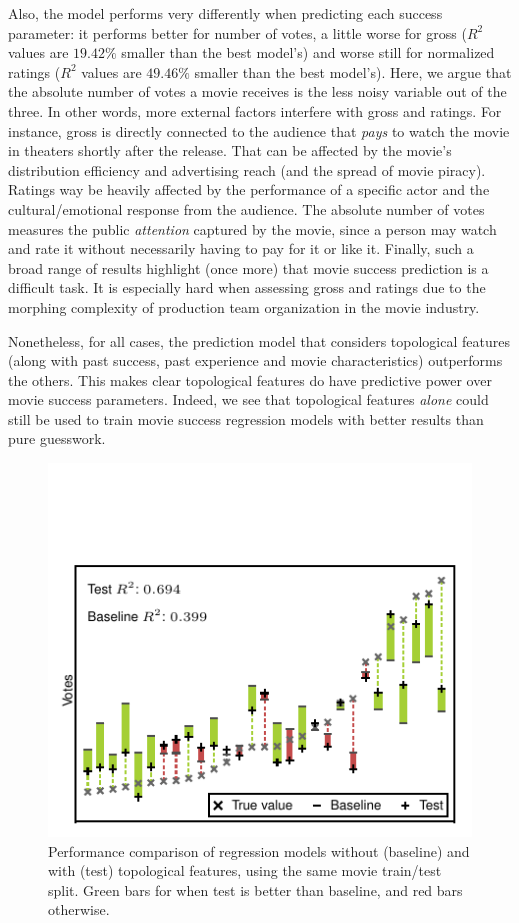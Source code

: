 Also, the model performs very differently when predicting each success
parameter: it performs better for number of votes, a little worse for gross
($R^2$ values are $19.42\%$ smaller than the best model's) and worse still for
normalized ratings ($R^2$ values are $49.46\%$ smaller than the best model's).
Here, we argue that the absolute number of votes a movie receives is the less
noisy variable out of the three.  In other words, more external factors
interfere with gross and ratings. For instance, gross is directly connected to
the audience that \textit{pays} to watch the movie in theaters shortly after the
release. That can be affected by the movie's distribution efficiency and
advertising reach (and the spread of movie piracy). Ratings way be heavily
affected by the performance of a specific actor and the cultural/emotional
response from the audience. The absolute number of votes measures the public
\textit{attention} captured by the movie, since a person may watch and rate it
without necessarily having to pay for it or like it. Finally, such a broad
range of results highlight (once more) that movie success prediction is a
difficult task. It is especially hard when assessing gross and ratings due to
the morphing complexity of production team organization in the movie industry.

Nonetheless, for all cases, the prediction model that considers topological
features (along with past success, past experience and movie characteristics)
outperforms the others. This makes clear topological features do have
predictive power over movie success parameters. Indeed, we see that
topological features \textit{alone} could still be used to train movie success
regression models with better results than pure guesswork.

\begin{figure}[H]\begin{center}
\includegraphics[width=0.9\columnwidth]{../../images/pred_final2.pdf}
\caption{\label{fig:pred_evaluation}Performance comparison of regression
models without (baseline) and with (test) topological features, using the same
movie train/test split. Green bars for when test is better than baseline, and
red bars otherwise.}
\end{center}\end{figure}

